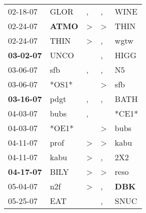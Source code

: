 \begin{supertabular}{p{0.07\textwidth}p{0.06\textwidth}p{0.02\textwidth}p{0.02\textwidth}p{0.06\textwidth}}
          02-18-07\textsuperscript{} &           GLOR\textsuperscript{} &                , &                , &           WINE\textsuperscript{} \\
          02-24-07\textsuperscript{} &  \textbf{ATMO\textsuperscript{}} &     \textgreater &     \textgreater &           THIN\textsuperscript{} \\
          02-24-07\textsuperscript{} &           THIN\textsuperscript{} &     \textgreater &                , &           wgtw\textsuperscript{} \\
 \textbf{03-02-07\textsuperscript{}} &           UNCO\textsuperscript{} &                  &                , &           HIGG\textsuperscript{} \\
          03-06-07\textsuperscript{} &            sfb\textsuperscript{} &                , &                , &             N5\textsuperscript{} \\
          03-06-07\textsuperscript{} &                            *OS1* &                  &     \textgreater &            sfb\textsuperscript{} \\
 \textbf{03-16-07\textsuperscript{}} &           pdgt\textsuperscript{} &                , &                , &           BATH\textsuperscript{} \\
          04-03-07\textsuperscript{} &           bubs\textsuperscript{} &                , &                  &                            *CE1* \\
          04-03-07\textsuperscript{} &                            *OE1* &                  &     \textgreater &           bubs\textsuperscript{} \\
          04-11-07\textsuperscript{} &           prof\textsuperscript{} &     \textgreater &     \textgreater &           kabu\textsuperscript{} \\
          04-11-07\textsuperscript{} &           kabu\textsuperscript{} &     \textgreater &                , &            2X2\textsuperscript{} \\
 \textbf{04-17-07\textsuperscript{}} &           BILY\textsuperscript{} &     \textgreater &     \textgreater &           reso\textsuperscript{} \\
          05-04-07\textsuperscript{} &            n2f\textsuperscript{} &     \textgreater &                , &   \textbf{DBK\textsuperscript{}} \\
          05-25-07\textsuperscript{} &            EAT\textsuperscript{} &                  &                , &           SNUC\textsuperscript{} \\

\end{supertabular}
